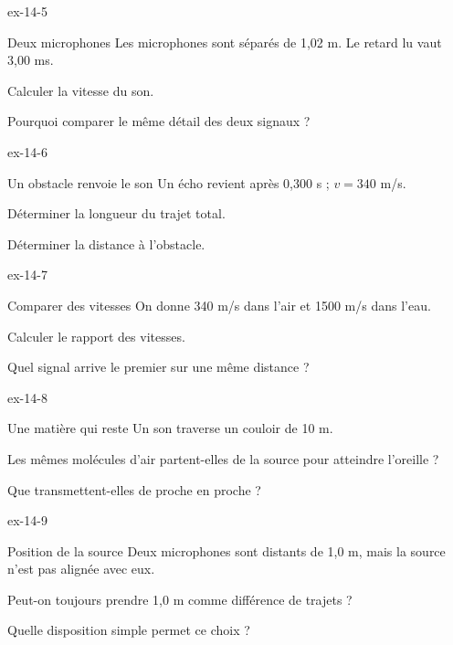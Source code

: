 \begin{blocLivre}{ex-14-5}\begin{exercice}[2]{Deux microphones}
Les microphones sont séparés de 1,02 m. Le retard lu vaut 3,00 ms.
\begin{questions}
\item Calculer la vitesse du son.
\item Pourquoi comparer le même détail des deux signaux ?
\end{questions}
\end{exercice}\end{blocLivre}
\begin{blocLivre}{ex-14-6}\begin{exercice}[2]{Un obstacle renvoie le son}
Un écho revient après 0,300 s ; $v=340$ m/s.
\begin{questions}
\item Déterminer la longueur du trajet total.
\item Déterminer la distance à l’obstacle.
\end{questions}
\end{exercice}\end{blocLivre}
\begin{blocLivre}{ex-14-7}\begin{exercice}[2]{Comparer des vitesses}
On donne 340 m/s dans l’air et 1500 m/s dans l’eau.
\begin{questions}
\item Calculer le rapport des vitesses.
\item Quel signal arrive le premier sur une même distance ?
\end{questions}
\end{exercice}\end{blocLivre}
\begin{blocLivre}{ex-14-8}\begin{exercice}[2]{Une matière qui reste}
Un son traverse un couloir de 10 m.
\begin{questions}
\item Les mêmes molécules d’air partent-elles de la source pour atteindre l’oreille ?
\item Que transmettent-elles de proche en proche ?
\end{questions}
\end{exercice}\end{blocLivre}
\begin{blocLivre}{ex-14-9}\begin{exercice}[3]{Position de la source}
Deux microphones sont distants de 1,0 m, mais la source n’est pas alignée avec eux.
\begin{questions}
\item Peut-on toujours prendre 1,0 m comme différence de trajets ?
\item Quelle disposition simple permet ce choix ?
\end{questions}
\end{exercice}\end{blocLivre}
